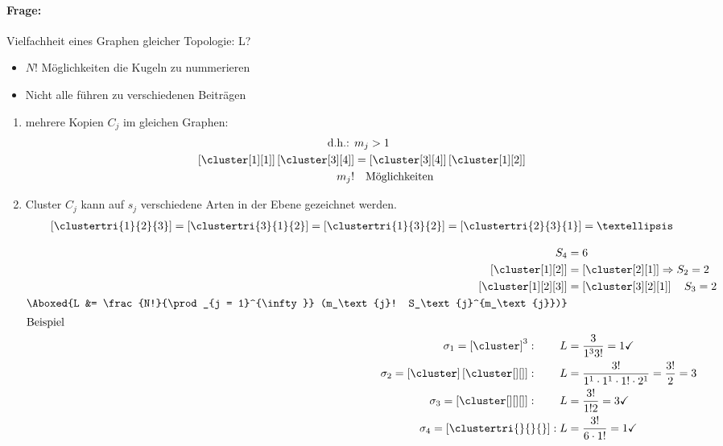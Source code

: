 \paragraph{Frage:} Vielfachheit eines Graphen gleicher Topologie: L?
\begin{itemize}
    \item $N!$ Möglichkeiten die Kugeln zu nummerieren
    \item Nicht alle führen zu verschiedenen Beiträgen
\end{itemize}

\begin{enumerate}
    \item mehrere Kopien $C_j$ im gleichen Graphen:
        \begin{align}
            \text{d.h.: } &m_j >1\\
            \left[\cluster[1][1]\right]\left[\cluster[3][4]\right] &= \left[\cluster[3][4]\right]\left[\cluster[1][2]\right] \\
            m_j! &\quad \text{Möglichkeiten}\\
        \end{align}
    \item Cluster $C_j$ kann auf $s_j$ verschiedene Arten in der Ebene gezeichnet werden.
        \begin{align}
            \left[\clustertri{1}{2}{3}\right] = \left[\clustertri{3}{1}{2}\right] = \left[\clustertri{1}{3}{2}\right] = \left[\clustertri{2}{3}{1}\right] = …
        \end{align}

        \begin{align}
            S_4 &= 6\\
            \left[\cluster[1][2]\right] &= \left[\cluster[2][1]\right] \Rightarrow  S_2=2\\
            \left[\cluster[1][2][3]\right] &= \left[\cluster[3][2][1]\right] \quad S_3 =2\\
            \Aboxed{L &= \frac{N!}{\prod_{j = 1}^{\infty}} (m_\text{j}! S_\text{j}^{m_\text{j}})}\\
        \intertext{Beispiel}
            \sigma_1 =\left[\cluster\right]^3:     \qquad L&=\frac{3}{1^3 3!}= 1 \checkmark\\ 
            \sigma_2 = \left[\cluster\right]\left[\cluster[][]\right]: \qquad L&= \frac{3!}{1^1 \cdot 1^1 \cdot 1! \cdot 2^1} = \frac{3!}{2} = 3 \\
            \sigma_3 = \left[\cluster[][][]\right]: \qquad L&=\frac{3!}{1!2}=3 \checkmark \\
            \sigma_4 = \left[\clustertri{}{}{}\right]: L&=\frac{3!}{6 \cdot 1!} =1 \checkmark
        \end{align}
\end{enumerate}

